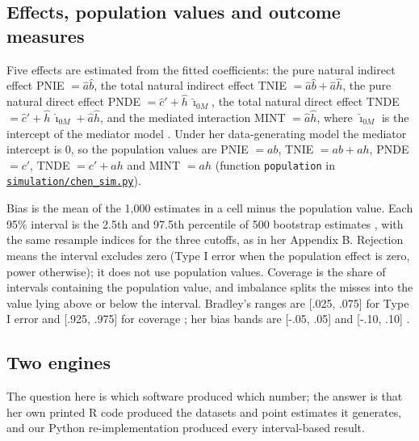 \subsection{Effects, population values and outcome measures}\label{sec:effects}

Five effects are estimated from the fitted coefficients: the pure natural indirect effect PNIE $= \hat a\hat b$, the total natural indirect effect TNIE $= \hat a\hat b + \hat a\hat h$, the pure natural direct effect PNDE $= \hat c' + \hat h\,\hat\imath_{0M}$, the total natural direct effect TNDE $= \hat c' + \hat h\,\hat\imath_{0M} + \hat a\hat h$, and the mediated interaction MINT $= \hat a\hat h$, where $\hat\imath_{0M}$ is the intercept of the mediator model \citep{valeri2013,vanderweele2015}. Under her data-generating model the mediator intercept is 0, so the population values are PNIE $= ab$, TNIE $= ab + ah$, PNDE $= c'$, TNDE $= c' + ah$ and MINT $= ah$ (function \texttt{population} in \href{https://github.com/alectionary/vibe-math/blob/master/formalization/chen-rdd-mediation/simulation/chen_sim.py#L41}{\nolinkurl{simulation/chen_sim.py}}).

Bias is the mean of the 1,000 estimates in a cell minus the population value. Each 95\% interval is the 2.5th and 97.5th percentile of 500 bootstrap estimates \citep{efron1993}, with the same resample indices for the three cutoffs, as in her Appendix B. Rejection means the interval excludes zero (Type I error when the population effect is zero, power otherwise); it does not use population values. Coverage is the share of intervals containing the population value, and imbalance splits the misses into the value lying above or below the interval. Bradley's ranges are [.025, .075] for Type I error and [.925, .975] for coverage \citep{bradley1978}; her bias bands are [-.05, .05] and [-.10, .10] \citep{hoogland1998}.

\subsection{Two engines}\label{sec:engines}

The question here is which software produced which number; the answer is that her own printed R code produced the datasets and point estimates it generates, and our Python re-implementation produced every interval-based result.

